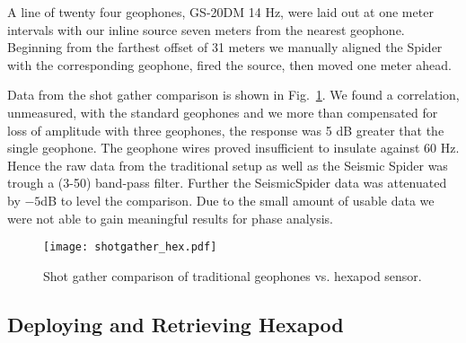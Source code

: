 A line of twenty four geophones, GS-20DM 14 Hz, were laid out at one meter intervals with our inline source seven meters from the nearest geophone. Beginning from the farthest offset of 31 meters we manually aligned the Spider with the corresponding geophone, fired the source, then moved one meter ahead. 

Data from the shot gather comparison is shown in Fig.~\ref{fig:shotgatherHexpod}.
We found a correlation, unmeasured, with the standard geophones and we more than compensated for loss of amplitude with three geophones, the response was 5 dB greater that the single geophone. The geophone wires proved insufficient to insulate against 60 Hz. Hence the raw data from the traditional setup as well as the Seismic Spider was trough a (3-50) band-pass filter. Further the SeismicSpider data was attenuated by $-5$dB to level the comparison.  Due to the small amount of usable data we were not able to gain meaningful results for phase analysis.   

\begin{figure} \centering
  {\texttt{[image: shotgather\_hex.pdf]}}
 \caption{Shot gather comparison of traditional geophones vs. hexapod sensor. 
 \label{fig:shotgatherHexpod}}
\end{figure}



\subsection{Deploying and Retrieving Hexapod}
